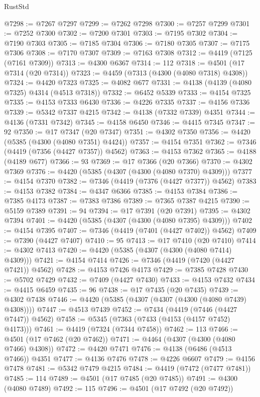 \begin{lexlean}{RustStd}
\begin{coremodule}
@7298 := @7267 @7297
@7299 := @7262 @7298
@7300 := @7257 @7299
@7301 := @7252 @7300
@7302 := @7200 @7301
@7303 := @7195 @7302
@7304 := @7190 @7303
@7305 := @7185 @7304
@7306 := @7180 @7305
@7307 := @7175 @7306
@7308 := @7170 @7307
@7309 := @7163 @7308
@7312 := @4419 (@7125 (@7161 @7309))
@7313 := @4300 @6367
@7314 := 112
@7318 := @4501 (@17 @7314 (@20 @7314))
@7323 := @4459 (@7313 (@4300 (@4080 @7318) @4308))
@7324 := @4420 @7323
@7325 := @4082 @677
@7331 := @4138 (@4139 (@4080 @7325) @4314 (@4513 @7318))
@7332 := @6452 @5339
@7333 := @4154 @7325
@7335 := @4153 @7333 @6430
@7336 := @4226 @7335
@7337 := @4156 @7336
@7339 := @5342 @7337 @4215
@7342 := @4138 (@7332 @7339) @4351
@7344 := @4136 (@7331 @7342)
@7345 := @4158 @6450
@7346 := @4415 @7345
@7347 := 92
@7350 := @17 @7347 (@20 @7347)
@7351 := @4302 @7350
@7356 := @4420 (@5385 (@4300 (@4080 @7351) @4424))
@7357 := @4154 @7351
@7362 := @7346 (@4419 (@7356 (@4427 @7357)) @4562)
@7363 := @4153 @7362
@7365 := @4188 (@4189 @677)
@7366 := 93
@7369 := @17 @7366 (@20 @7366)
@7370 := @4302 @7369
@7376 := @4420 (@5385 (@4307 (@4300 (@4080 @7370) @4309)))
@7377 := @4154 @7370
@7382 := @7346 (@4419 (@7376 (@4427 @7377)) @4562)
@7383 := @4153 @7382
@7384 := @4347 @6366
@7385 := @4153 @7384
@7386 := @7385 @4173
@7387 := @7383 @7386
@7389 := @7365 @7387 @4215
@7390 := @5159 @7389
@7391 := 94
@7394 := @17 @7391 (@20 @7391)
@7395 := @4302 @7394
@7401 := @4420 (@5385 (@4307 (@4300 (@4080 @7395) @4309)))
@7402 := @4154 @7395
@7407 := @7346 (@4419 (@7401 (@4427 @7402)) @4562)
@7409 := @7390 (@4427 @7407)
@7410 := 95
@7413 := @17 @7410 (@20 @7410)
@7414 := @4302 @7413
@7420 := @4420 (@5385 (@4307 (@4300 (@4080 @7414) @4309)))
@7421 := @4154 @7414
@7426 := @7346 (@4419 (@7420 (@4427 @7421)) @4562)
@7428 := @4153 @7426 @4173
@7429 := @7385 @7428
@7430 := @5702 @7429
@7432 := @7409 (@4427 @7430)
@7433 := @4153 @7432
@7434 := @4415 @6459
@7435 := 96
@7438 := @17 @7435 (@20 @7435)
@7439 := @4302 @7438
@7446 := @4420 (@5385 (@4307 (@4307 (@4300 (@4080 @7439) @4308))))
@7447 := @4513 @7439
@7452 := @7434 (@4419 (@7446 (@4427 @7447)) @4562)
@7458 := @5345 (@7363 (@7433 (@4153 (@4157 @7452) @4173)))
@7461 := @4419 (@7324 (@7344 @7458))
@7462 := 113
@7466 := @4501 (@17 @7462 (@20 @7462))
@7471 := @4464 (@4307 (@4300 (@4080 @7466) @4308))
@7472 := @4420 @7471
@7476 := @4138 (@6486 (@4513 @7466)) @4351
@7477 := @4136 @7476
@7478 := @4226 @6607
@7479 := @4156 @7478
@7481 := @5342 @7479 @4215
@7484 := @4419 (@7472 (@7477 @7481))
@7485 := 114
@7489 := @4501 (@17 @7485 (@20 @7485))
@7491 := @4300 (@4080 @7489)
@7492 := 115
@7496 := @4501 (@17 @7492 (@20 @7492))

\end{coremodule}
\end{lexlean}
